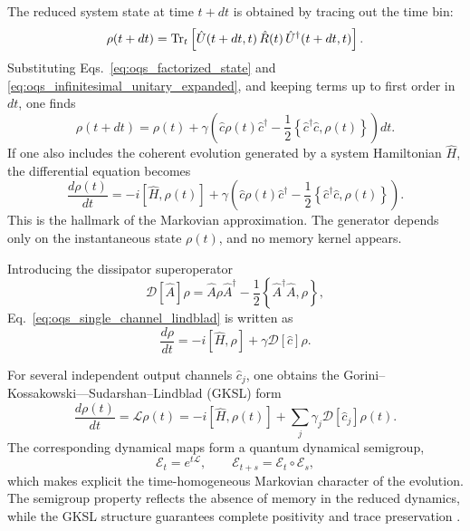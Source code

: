 The reduced system state at time $t+dt$ is obtained by tracing out the time bin:
\begin{equation}
	\rho(t+dt)
	=
	\Tr_t
	\left[
	\hat U(t+dt,t)\,
	\hat R(t)\,
	\hat U^\dagger(t+dt,t)
	\right].
	\label{eq:oqs_reduced_state_update}
\end{equation}
Substituting Eqs.~\eqref{eq:oqs_factorized_state} and \eqref{eq:oqs_infinitesimal_unitary_expanded}, and keeping terms up to first order in $dt$, one finds
\begin{equation}
	\rho(t+dt)
	=
	\rho(t)
	+
	\gamma
	\left(
	\hat c \rho(t)\hat c^\dagger
	-
	\frac{1}{2}
	\left\{
	\hat c^\dagger \hat c,\rho(t)
	\right\}
	\right)dt.
	\label{eq:oqs_reduced_state_update_lindblad_step}
\end{equation}
If one also includes the coherent evolution generated by a system Hamiltonian $\hat H$, the differential equation becomes
\begin{equation}
	\frac{d\rho(t)}{dt}
	=
	-i[\hat H,\rho(t)]
	+
	\gamma
	\left(
	\hat c \rho(t) \hat c^\dagger
	-
	\frac{1}{2}
	\left\{
	\hat c^\dagger \hat c,\rho(t)
	\right\}
	\right).
	\label{eq:oqs_single_channel_lindblad}
\end{equation}
This is the hallmark of the Markovian approximation. The generator depends only on the instantaneous state \(\rho(t)\), and no memory kernel appears.

Introducing the dissipator superoperator
\begin{equation}
	\mathcal{D}[\hat A]\rho
	=
	\hat A \rho \hat A^\dagger
	-
	\frac{1}{2}
	\left\{
	\hat A^\dagger \hat A,\rho
	\right\},
	\label{eq:oqs_dissipator_definition}
\end{equation}
Eq.~\eqref{eq:oqs_single_channel_lindblad} is written as
\begin{equation}
	\frac{d\rho}{dt}
	=
	-i[\hat H,\rho]
	+
	\gamma \mathcal{D}[\hat c]\rho.
	\label{eq:oqs_single_channel_lindblad_compact}
\end{equation}

For several independent output channels $\hat c_j$, one obtains the Gorini--Kossakowski--\linebreak--Sudarshan--Lindblad (GKSL) form \cite{Lin76}
\begin{equation}
	\frac{d\rho(t)}{dt}
	=
	\mathcal{L}\rho(t)
	=
	-i[\hat H,\rho(t)]
	+
	\sum_j \gamma_j \mathcal{D}[\hat c_j]\rho(t).
	\label{eq:oqs_gksl_general}
\end{equation}
The corresponding dynamical maps form a quantum dynamical semigroup,
\begin{equation}
	\mathcal{E}_t = e^{t\mathcal{L}},
	\qquad
	\mathcal{E}_{t+s}=\mathcal{E}_t\circ \mathcal{E}_s,
	\label{eq:oqs_semigroup_property}
\end{equation}
which makes explicit the time-homogeneous Markovian character of the evolution. The semigroup property reflects the absence of memory in the reduced dynamics, while the GKSL structure guarantees complete positivity and trace preservation \cite{GKS76}.


